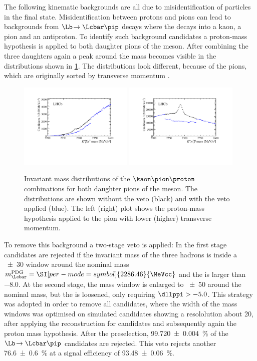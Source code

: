The following kinematic backgrounds are all due to misidentification of particles in the final state.
Misidentification between protons and pions can lead to backgrounds from $\Lb\!\to\Lcbar\pip$ decays where the \Lcbar decays into a kaon, a pion and an antiproton.
To identify such background candidates a proton-mass hypothesis is applied to both daughter pions of the \Dm meson.
After combining the three \D daughters again a peak around the \Lc mass becomes visible in the distributions shown in \cref{fig:LcVeto}.
The distributions look different, because of the pions, which are originally sorted by transverse momentum \pt.
\begin{figure}[tbp]
    \centering
    \includegraphics[width=0.485\textwidth]{07selection/figs/LcHypo1.pdf}
    \includegraphics[width=0.485\textwidth]{07selection/figs/LcHypo2.pdf}
    \caption{Invariant mass distributions of the $\kaon\pion\proton$ combinations for both daughter pions of the \Dm meson.
    The distributions are shown without the veto (black) and with the veto applied (blue).
    The left (right) plot shows the proton-mass hypothesis applied to the pion with lower (higher) transverse momentum.}
    \label{fig:LcVeto}
\end{figure}
To remove this background a two-stage veto is applied: In the first stage candidates are rejected if the invariant mass of the three hadrons is inside a \SI[per-mode=symbol]{\pm30}{\MeVcc}  window around the nominal \mbox{\Lcbar mass} $m_\Lcbar^{\text{PDG}}=\SI[per-mode=symbol]{2286.46}{\MeVcc}$ and the \dllppi is larger than \num{-8.0}.
At the second stage, the mass window is enlarged to \SI[per-mode=symbol]{\pm50}{\MeVcc} around the nominal \Lcbar mass, but the \dllppi is loosened, only requiring $\dllppi>-5.0$.
This strategy was adopted in order to remove all \Lcbar candidates, where the width of the mass windows was optimised on simulated \Lcbar candidates showing a resololution about \SI[per-mode=symbol]{20}{\MeVcc}, after applying the reconstruction for \BdToDpi candidates and subsequently again the proton mass hypothesis.
After the preselection, \SI{99.720\pm0.004}{\percent} of the $\Lb\!\to\Lcbar\pip$ candidates are rejected.
This veto rejects another \SI{76.6\pm0.6}{\percent} at a signal efficiency of \SI{93.48\pm0.06}{\percent}.

